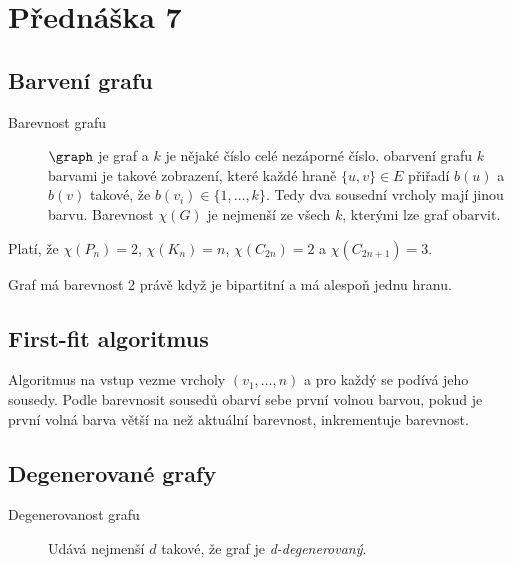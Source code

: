 \section{Přednáška 7}

\subsection{Barvení grafu}

\begin{description}
    \item[Barevnost grafu] $\graph$ je graf a $k$ je nějaké číslo celé nezáporné číslo.
    obarvení grafu $k$ barvami je takové zobrazení, které každé hraně $\{u, v\} \in E$ přiřadí $b(u)$ a $b(v)$ takové, že $b(v_i) \in \{1, \dots, k\}$.
    Tedy dva sousední vrcholy mají jinou barvu.
    Barevnost $\chi(G)$ je nejmenší ze všech $k$, kterými lze graf obarvit.
\end{description}

Platí, že $\chi(P_n) = 2$, $\chi(K_n) = n$, $\chi(C_{2n}) = 2$ a $\chi(C_{2n+1}) = 3$.

Graf má barevnost 2 právě když je bipartitní a má alespoň jednu hranu.

\subsection{First-fit algoritmus}

Algoritmus na vstup vezme vrcholy $(v_1, \ldots, n)$ a pro každý se podívá jeho sousedy.
Podle barevnosit sousedů obarví sebe první volnou barvou, pokud je první volná barva větší na než aktuální barevnost, inkrementuje barevnost.

\subsection{Degenerované grafy}


\begin{description}
    \item[Degenerovanost grafu] Udává nejmenší $d$ takové, že graf je \textit{d-degenerovaný}.
\end{description}



